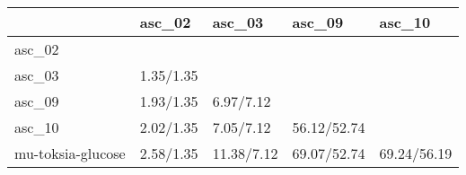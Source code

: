 \begin{tabular}{lllll}
\toprule
{} &     asc\_02 &      asc\_03 &       asc\_09 &       asc\_10 \\
\midrule
asc\_02            &            &             &              &              \\
asc\_03            &  1.35/1.35 &             &              &              \\
asc\_09            &  1.93/1.35 &   6.97/7.12 &              &              \\
asc\_10            &  2.02/1.35 &   7.05/7.12 &  56.12/52.74 &              \\
mu-toksia-glucose &  2.58/1.35 &  11.38/7.12 &  69.07/52.74 &  69.24/56.19 \\
\bottomrule
\end{tabular}
